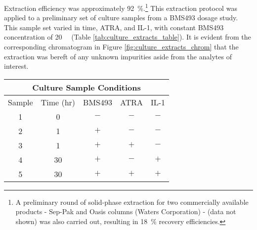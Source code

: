 \begin{refsection}
Extraction efficiency was approximately \SI{92}{\percent}.\footnote{A
    preliminary round of solid-phase extraction for two commercially available
    products - Sep-Pak  and Oasis columns (Waters Corporation) - (data
    not shown) was also carried out, resulting in \SI{18}{\percent} recovery
efficiencies.}
This extraction protocol was applied to a preliminary set of culture samples
from a BMS493 dosage study. This sample set varied in time, ATRA, and IL-1, with
constant BMS493 concentration of \SI{20}{\micro\moLar} (Table
\ref{tab:culture_extracts_table}). It is evident from the corresponding
chromatogram in Figure \ref{fig:culture_extracts_chrom} that the extraction was
bereft of any unknown impurities aside from the analytes of interest. 

\begin{table}[h!]
    \centering
\begin{tabular}{ ccccc }
  \hline
  \multicolumn{5}{c}{Culture Sample Conditions} \\
  \hline
  Sample & Time (hr) & BMS493 & ATRA & IL-1 \\
  \hline

  1 & 0 & ${-}$ & ${-}$ & ${-}$ \\
  2 & 1 & ${+}$ & ${-}$ & ${-}$ \\
  3 & 1 & ${+}$ & ${+}$ & ${-}$ \\
  4 & 30 & ${+}$ & ${-}$ & ${+}$ \\
  5 & 30 & ${+}$ & ${+}$ & ${+}$ \\


\end{tabular}
\end{table}
\end{refsection}
